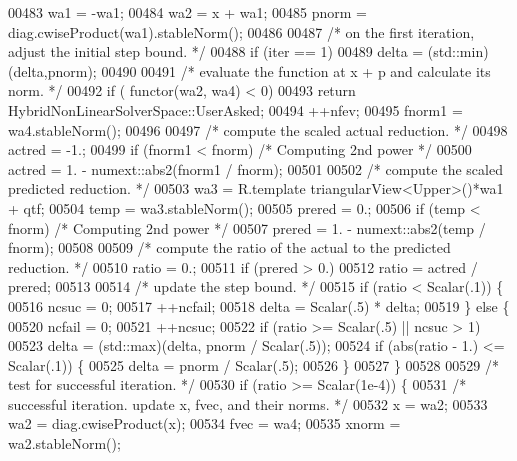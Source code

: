 \begin{DoxyCode}
00483         wa1 = -wa1;
00484         wa2 = x + wa1;
00485         pnorm = diag.cwiseProduct(wa1).stableNorm();
00486 
00487         \textcolor{comment}{/* on the first iteration, adjust the initial step bound. */}
00488         \textcolor{keywordflow}{if} (iter == 1)
00489             delta = (std::min)(delta,pnorm);
00490 
00491         \textcolor{comment}{/* evaluate the function at x + p and calculate its norm. */}
00492         \textcolor{keywordflow}{if} ( functor(wa2, wa4) < 0)
00493             \textcolor{keywordflow}{return} HybridNonLinearSolverSpace::UserAsked;
00494         ++nfev;
00495         fnorm1 = wa4.stableNorm();
00496 
00497         \textcolor{comment}{/* compute the scaled actual reduction. */}
00498         actred = -1.;
00499         \textcolor{keywordflow}{if} (fnorm1 < fnorm) \textcolor{comment}{/* Computing 2nd power */}
00500             actred = 1. - numext::abs2(fnorm1 / fnorm);
00501 
00502         \textcolor{comment}{/* compute the scaled predicted reduction. */}
00503         wa3 = R.template triangularView<Upper>()*wa1 + qtf;
00504         temp = wa3.stableNorm();
00505         prered = 0.;
00506         \textcolor{keywordflow}{if} (temp < fnorm) \textcolor{comment}{/* Computing 2nd power */}
00507             prered = 1. - numext::abs2(temp / fnorm);
00508 
00509         \textcolor{comment}{/* compute the ratio of the actual to the predicted reduction. */}
00510         ratio = 0.;
00511         \textcolor{keywordflow}{if} (prered > 0.)
00512             ratio = actred / prered;
00513 
00514         \textcolor{comment}{/* update the step bound. */}
00515         \textcolor{keywordflow}{if} (ratio < Scalar(.1)) \{
00516             ncsuc = 0;
00517             ++ncfail;
00518             delta = Scalar(.5) * delta;
00519         \} \textcolor{keywordflow}{else} \{
00520             ncfail = 0;
00521             ++ncsuc;
00522             \textcolor{keywordflow}{if} (ratio >= Scalar(.5) || ncsuc > 1)
00523                 delta = (std::max)(delta, pnorm / Scalar(.5));
00524             \textcolor{keywordflow}{if} (abs(ratio - 1.) <= Scalar(.1)) \{
00525                 delta = pnorm / Scalar(.5);
00526             \}
00527         \}
00528 
00529         \textcolor{comment}{/* test for successful iteration. */}
00530         \textcolor{keywordflow}{if} (ratio >= Scalar(1e-4)) \{
00531             \textcolor{comment}{/* successful iteration. update x, fvec, and their norms. */}
00532             x = wa2;
00533             wa2 = diag.cwiseProduct(x);
00534             fvec = wa4;
00535             xnorm = wa2.stableNorm();

\end{DoxyCode}
